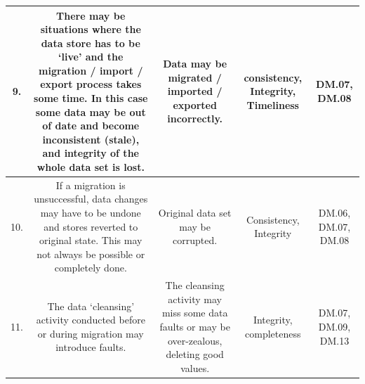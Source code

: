 \begin{longtable}{|C{}|C{}|C{}|C{}|C{}|}
%
9.&
There may be situations where the data store has to be ‘live’ and the migration / import / export process takes some time.
In this case some data may be out of date and become inconsistent (stale), and integrity of the whole data set is lost.&
Data may be migrated / imported / exported incorrectly.&
\Gls{consistency}, Integrity, Timeliness&
DM.07, DM.08\\\hline
%
10.&
If a migration is unsuccessful, data changes may have to be undone and stores reverted to original state.
This may not always be possible or completely done.&
Original data set may be corrupted.&
Consistency, Integrity&
DM.06, DM.07, DM.08\\\hline
%
11.&
The data ‘cleansing’ activity conducted before or during migration may introduce faults.&
The cleansing activity may miss some data faults or may be over-zealous, deleting good values.&
Integrity, \gls{completeness}&
DM.07, DM.09, DM.13\\\hline
\end{longtable}
